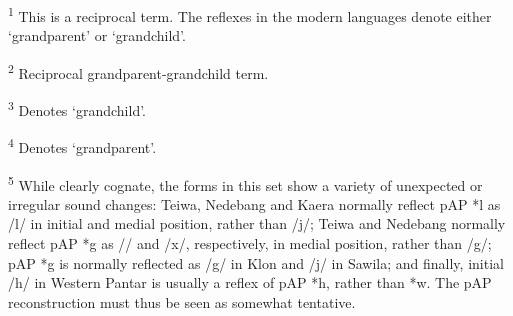 \textsuperscript{1} This is a reciprocal term. The reflexes in the modern languages denote either `grandparent' or `grandchild'.  

\textsuperscript{2} Reciprocal grandparent-grandchild term.

\textsuperscript{3} Denotes `grandchild'.  

\textsuperscript{4} Denotes `grandparent'.  

\textsuperscript{5} While clearly cognate, the forms in this set show a variety of unexpected or irregular sound changes: Teiwa, Nedebang and Kaera normally reflect pAP *l as /l/ in initial and medial position, rather than /j/; Teiwa and Nedebang normally reflect pAP *g as /{\pharfric}/ and /x/, respectively, in medial position, rather than /g/; pAP *g is normally reflected as /g/ in Klon and /j/ in Sawila; and finally, initial /h/ in Western Pantar is usually a reflex of pAP *h, rather than *w. The pAP reconstruction must thus be seen as somewhat tentative.





